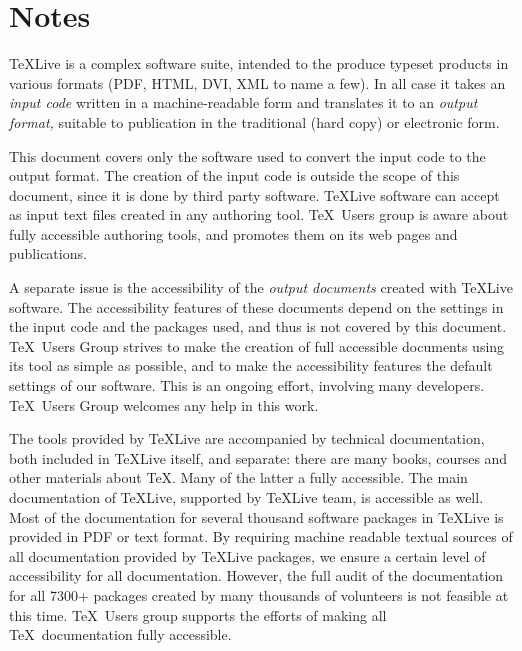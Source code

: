 \documentclass[a4paper]{report}
\begin{document}
\newpage

\section{Notes}
\label{sec:note}

  
\TeX Live is a complex software suite, intended to the produce typeset
products in various formats (PDF, HTML, DVI, XML to name a few).  In
all case it takes an \emph{input code} written in a machine-readable
form and translates it to an \emph{output format,} suitable to
publication in the traditional (hard copy) or electronic form.

This document covers only the software used to convert the input code
to the output format.  The creation of the input code is outside the
scope of this document, since it is done by third party software.
\TeX Live software can accept as input text files created in any
authoring tool.  \TeX\ Users group is aware about fully accessible
authoring tools, and promotes them on its web pages and publications.

A separate issue is the accessibility of the \emph{output documents}
created with \TeX Live software.  The accessibility features of these
documents depend on the settings in the input code and the packages
used, and thus is not covered by this document.  \TeX\ Users Group
strives to make the creation of full accessible documents using its
tool as simple as possible, and to make the accessibility features the
default settings of our software.  This is an ongoing effort,
involving many developers.  \TeX\ Users Group welcomes any help in
this work.

The tools provided by \TeX Live are accompanied by technical
documentation, both included in \TeX Live itself, and separate: there
are many books, courses and other materials about \TeX.  Many of the
latter a fully accessible.  The main documentation of \TeX Live,
supported by \TeX Live team, is accessible as well.  Most of the
documentation for several thousand software packages in \TeX Live is
provided in PDF or text format.  By requiring machine readable textual
sources of all documentation provided by \TeX Live packages, we ensure
a certain level of accessibility for all documentation.  However, the
full audit of the documentation for all 7300+ packages created by many
thousands of volunteers is not feasible at this time.  \TeX\ Users
group supports the efforts of making all \TeX\ documentation fully
accessible.

\newpage
\end{document}
